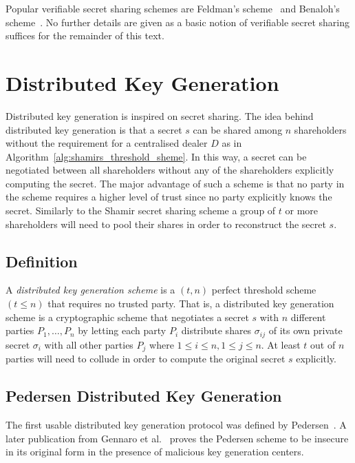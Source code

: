 Popular verifiable secret sharing schemes are Feldman's scheme~\cite{art:Feldman87} and Benaloh's scheme~\cite{art:Benaloh86a}. No further details are given as a basic notion of verifiable secret sharing suffices for the remainder of this text.

\section{Distributed Key Generation}
\label{sec:distributed_key_generation}
Distributed key generation is inspired on secret sharing. The idea behind distributed key generation is that a secret $s$ can be shared among $n$ shareholders without the requirement for a centralised dealer $D$ as in Algorithm~\ref{alg:shamirs_threshold_sheme}. In this way, a secret can be negotiated between all shareholders without any of the shareholders explicitly computing the secret. The major advantage of such a scheme is that no party in the scheme requires a higher level of trust since no party explicitly knows the secret. Similarly to the Shamir secret sharing scheme a group of $t$ or more shareholders will need to pool their shares in order to reconstruct the secret $s$.

\subsection{Definition}
\begin{defn}
\label{def:dkg_scheme}
 A \textit{distributed key generation scheme} is a $\left( t,n \right)$ perfect threshold scheme $\left( t \leq n \right)$ that requires no trusted party. That is, a distributed key generation scheme is a cryptographic scheme that negotiates a secret $s$ with $n$ different parties $P_1, \ldots, P_n$ by letting each party $P_i$ distribute shares $\sigma_{ij}$ of its own private secret $\sigma_i$ with all other parties $P_j$ where $1 \leq i \leq n, 1 \leq j \leq n$. At least $t$ out of $n$ parties will need to collude in order to compute the original secret $s$ explicitly.
\end{defn}

\subsection{Pedersen Distributed Key Generation}
The first usable distributed key generation protocol was defined by Pedersen~\cite{art:Pedersen91a}. A later publication from Gennaro et al.~\cite{art:GennaroJKR07} proves the Pedersen scheme to be insecure in its original form in the presence of malicious key generation centers.

